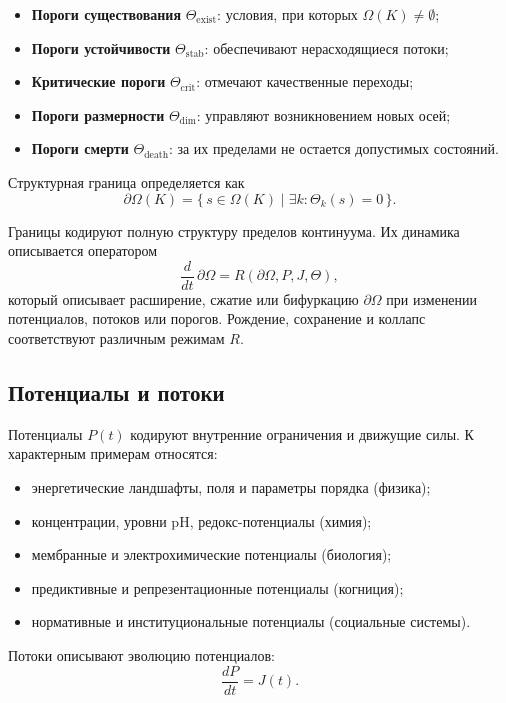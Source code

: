 \begin{itemize}
    \item \textbf{Пороги существования} \(\Theta_{\mathrm{exist}}\): условия, при которых \(\Omega(K)\neq\emptyset\);
    \item \textbf{Пороги устойчивости} \(\Theta_{\mathrm{stab}}\): обеспечивают нерасходящиеся потоки;
    \item \textbf{Критические пороги} \(\Theta_{\mathrm{crit}}\): отмечают качественные переходы;
    \item \textbf{Пороги размерности} \(\Theta_{\mathrm{dim}}\): управляют возникновением новых осей;
    \item \textbf{Пороги смерти} \(\Theta_{\mathrm{death}}\): за их пределами не остается допустимых состояний.
\end{itemize}

Структурная граница определяется как
\[
\partial\Omega(K) = \{\, s\in\Omega(K) \mid \exists k: \Theta_k(s)=0 \,\}.
\]

Границы кодируют полную структуру пределов континуума.
Их динамика описывается оператором
\[
\frac{d}{dt}\,\partial\Omega = R(\partial\Omega, P, J, \Theta),
\]
который описывает расширение, сжатие или бифуркацию \(\partial\Omega\) при изменении потенциалов, потоков или порогов.
Рождение, сохранение и коллапс соответствуют различным режимам \(R\).

\subsection{Потенциалы и потоки}

Потенциалы \(P(t)\) кодируют внутренние ограничения и движущие силы.
К характерным примерам относятся:

\begin{itemize}
    \item энергетические ландшафты, поля и параметры порядка (физика);
    \item концентрации, уровни pH, редокс-потенциалы (химия);
    \item мембранные и электрохимические потенциалы (биология);
    \item предиктивные и репрезентационные потенциалы (когниция);
    \item нормативные и институциональные потенциалы (социальные системы).
\end{itemize}

Потоки описывают эволюцию потенциалов:
\[
\frac{dP}{dt} = J(t).
\]

